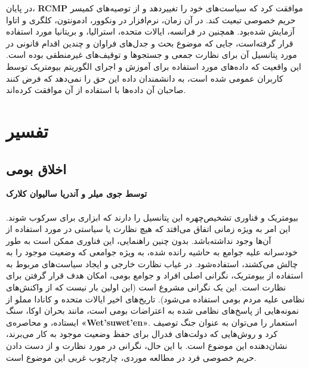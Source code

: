 در پایان، \textenglish{\textbf{RCMP}} موافقت کرد که سیاست‌های خود را تغییر‌دهد و از توصیه‌های کمیسر حریم خصوصی تبعیت کند.
در آن زمان، نرم‌افزار در ونکوور، ادمونتون، کلگری و اتاوا آزمایش شده‌بود.
همچنین در فرانسه، ایالات متحده، استرالیا، و بریتانیا مورد استفاده قرار گرفته‌است، جایی که موضوع بحث و جدل‌های فراوان و چندین اقدام قانونی در مورد پتانسیل آن برای نظارت جمعی و جستجوها و توقیف‌های غیرمنطقی بوده است.
این واقعیت که داده‌های مورد استفاده برای آموزش و اجرای الگوریتم بیومتریک توسط کاربران عمومی شده است، به دانشمندان داده این حق را نمی‌دهد که فرض کنند صاحبان آن داده‌ها با استفاده از آن موافقت کرده‌اند.
\newline
\newline




{
\section*{تفسیر}
\label{sec:تفسیر}


\subsection*{اخلاق بومی}
\label{subsec:اخلاق بومی}
\noindent \textbf{توسط جوی میلر و آندریا سالیوان کلارک}
\\\\
بیومتریک و فناوری تشخیص‌چهره این پتانسیل را دارند که ابزاری برای سرکوب شوند. این امر به ویژه زمانی اتفاق می‌افتد که هیچ نظارت یا سیاستی در مورد استفاده از آن‌ها وجود نداشته‌باشد. بدون چنین راهنمایی، این فناوری ممکن است به طور خودسرانه علیه جوامع به حاشیه رانده شده، به ویژه جوامعی که وضعیت موجود را به چالش می‌کشند، استفاده‌شود. در غیاب نظارت خارجی و ایجاد سیاست‌های مربوط به استفاده از بیومتریک، نگرانی اصلی افراد و جوامع بومی، امکان هدف قرار گرفتن برای نظارت است. این یک نگرانی مشروع است (این اولین بار نیست که از واکنش‌های نظامی علیه مردم بومی استفاده می‌شود). تاریخ‌های اخیر ایالات متحده و کانادا مملو از نمونه‌هایی از پاسخ‌های نظامی شده به اعتراضات بومی است، مانند بحران اوکا، سنگ ایستاده، و محاصره‌ی \textenglish{\textbf{«Wet’suwet’en»}}. استعمار را می‌توان به عنوان جنگ توصیف کرد و روش‌هایی که دولت‌های فدرال برای حفظ وضعیت موجود به کار می‌برند، نشان‌دهنده این موضوع است. با این حال، نگرانی در مورد نظارت و از دست دادن حریم خصوصی فرد در مطالعه موردی، چارچوب غربی این موضوع است.
}

